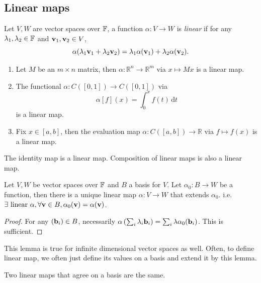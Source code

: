 \documentclass[a4paper]{article}
\begin{document}
\subsection{Linear maps}
\begin{definition}
    Let $V,W$ are vector spaces over ${\mathbb{F}}$, a function $\alpha:V\to W$ is \textit{linear} if for any $\lambda_1,\lambda_2\in {\mathbb{F}}$ and ${\bf v}_1,{\bf v}_2\in V$,
    $$\alpha(\lambda_1{\bf v}_1+\lambda_2{\bf v}_2)=\lambda_1\alpha({\bf v}_1)+\lambda_2\alpha({\bf v}_2).$$
\end{definition}
\begin{example}
    \begin{enumerate}
        \item Let $M$ be an $m\times n$ matrix, then $\alpha:\mathbb R^n\to\mathbb R^m$ via $x\mapsto Mx$ is a linear map.
        \item The functional $\alpha:C([0,1])\to C([0,1])$ via
        $$\alpha[f](x)=\int_0^xf(t)\,\mathrm dt$$
        is a linear map.
        \item Fix $x\in[a,b]$, then the evaluation map $\alpha:C([a,b])\to\mathbb R$ via $f\mapsto f(x)$ is a linear map.
    \end{enumerate}
\end{example}
\begin{remark}
    The identity map is a linear map.
    Composition of linear maps is also a linear map.
\end{remark}
\begin{lemma}
    Let $V,W$ be vector spaces over ${\mathbb{F}}$ and $B$ a basis for $V$.
    Let $\alpha_0:B\to W$ be a function, then there is a unique linear map $\alpha:V\to W$ that extends $\alpha_0$. i.e. $\exists \text{ linear }\alpha, \forall{\bf v}\in B, \alpha_0({\bf v})=\alpha({\bf v}) $.
\end{lemma}
\begin{proof}
    For any $({\bf b}_i)\in B$, necessarily $\alpha\left(\sum_i\lambda_i{\bf b}_i\right)=\sum_i\lambda\alpha_0({\bf b}_i)$.
    This is sufficient.
\end{proof}
\begin{remark}
    This lemma is true for infinite dimensional vector spaces as well.
    Often, to define linear map, we often just define its values on a basis and extend it by this lemma.
\end{remark}
\begin{corollary}
    Two linear maps that agree on a basis are the same.
\end{corollary}
\end{document}
